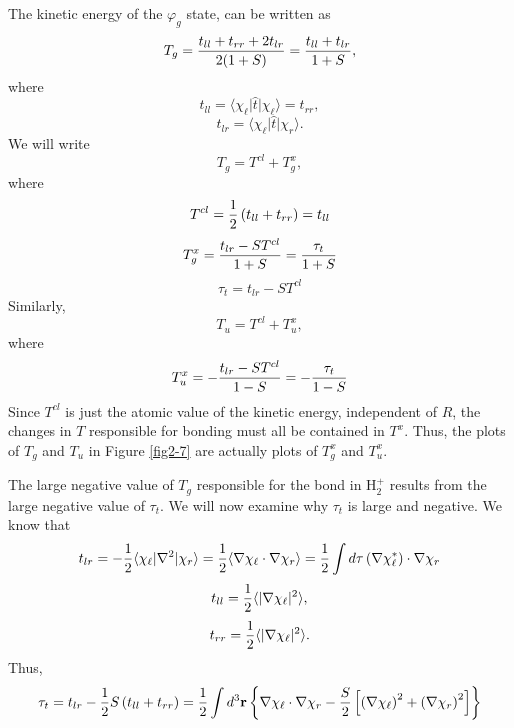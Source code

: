 The kinetic energy of the $\varphi_g$ state, can be written as
\begin{equation}
T_g = {t_{ll} + t_{rr} + 2t_{lr} \over 2(1+S)} = {t_{ll} + t_{lr} 
\over 1+S} ,
\end{equation}
where
\begin{equation}
t_{ll} = \langle \chi_\ell \vert {\hat t} \vert \chi_\ell \rangle = t_{rr} ,
\end{equation}
\begin{equation}
t_{lr} = \langle \chi_\ell \vert {\hat t} \vert \chi_r \rangle .
\end{equation}
We will write
\begin{equation}
T_g = T^{cl} + T^x_g ,
\end{equation}
where
\begin{equation}
T^{cl} = {1 \over 2} \left( t_{ll} + t_{rr} \right) = t_{ll}
\end{equation}
\begin{equation}
T^x_g = {t_{lr} - ST^{cl} \over 1+S} = {\tau_t \over 1+S}
\end{equation}
\begin{equation}
\tau_t = t_{lr} - ST^{cl}
\end{equation}
Similarly,
\begin{equation}
T_u = T^{cl} + T^x_u ,
\end{equation}
where
\begin{equation}
T^x_u = - {t_{lr} - ST^{cl} \over 1-S} = - {\tau_t \over 1-S}
\end{equation}
Since $T^{cl}$ is just the atomic value of the kinetic energy, 
independent of $R$, the changes in $T$ responsible for bonding must 
all be contained in $T^x$. Thus, the plots of $T_g$ and $T_u$ in
Figure \ref{fig2-7} are actually plots of $T^x_g$ and $T^x_u$.
    
The large negative value of $T_g$ responsible for the bond in H$^+_2$ results
from the large negative value of $\tau_t$.  We will now examine why 
$\tau_t$ is large and negative. We know that
\begin{equation}
t_{lr} = - {1 \over 2} \langle \chi_\ell \vert \nabla^2 \vert \chi_r 
\rangle = {1 \over 2} \langle \nabla \chi_\ell \cdot \nabla \chi_r 
\rangle = {1 \over 2} \int d \tau \left( \nabla \chi^*_\ell \right) 
\cdot \nabla \chi_r
\end{equation}
\begin{equation}
t_{ll} = {1 \over 2} \langle  \vert \nabla \chi_\ell \vert^2 \rangle ,
\end{equation}
\begin{equation}
t_{rr} = {1 \over 2} \langle  \vert \nabla \chi_\ell \vert^2 \rangle .
\end{equation}
Thus,
\begin{equation}
\tau_t = t_{lr} - {1 \over 2} S \left( t_{ll} + t_{rr} \right) =
{1 \over 2} \int d^3 {\bf r} \left\{ \nabla \chi_\ell \cdot \nabla 
\chi_r - {S \over 2} \left[ \left( \nabla \chi_\ell \right)^2 + \left( 
\nabla \chi_r \right)^2 \right] \right\}
\label{eqno2app-21}
\end{equation}
 
